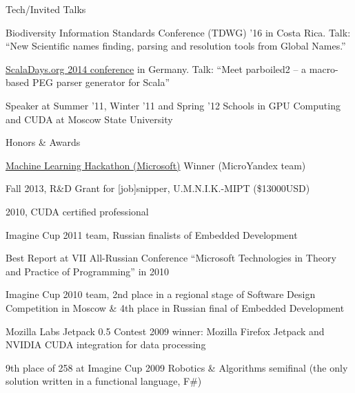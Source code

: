 \documentclass{resume} %
\begin{document}

\begin{rSubsectionSchools}{Tech/Invited Talks}
\item Biodiversity Information Standards Conference (TDWG) '16 in Costa Rica. Talk: ``New 
Scientific names finding, parsing and resolution tools from Global Names.''
\item
\href{https://www.parleys.com/tutorial/meet-parboiled2-a-macro-based-peg-parser-generator-scala-2-10-3}
{ScalaDays.org 2014 conference} in Germany. Talk: ``Meet parboiled2  -- a macro-based PEG
parser generator for Scala''
\item Speaker at Summer '11, Winter '11 and Spring '12 Schools in GPU Computing and CUDA at
Moscow State University
\end{rSubsectionSchools}


\begin{rSubsectionSchools}{Honors \& Awards}
\item \href{https://events.techdays.ru/machine-learning/2015-11/}{Machine Learning Hackathon (Microsoft)} Winner (MicroYandex team)
\item Fall 2013, R\&D Grant for [job]snipper, U.M.N.I.K.-MIPT (\$13000USD)
\item 2010, CUDA certified professional
\item Imagine Cup 2011 team, Russian finalists of Embedded Development
\item Best Report at VII All-Russian Conference ``Microsoft Technologies in Theory and Practice of Programming'' in 2010
\item Imagine Cup 2010 team, 2nd place in a regional stage of Software Design Competition in Moscow \& 4th place in Russian final of Embedded Development
\item Mozilla Labs Jetpack 0.5 Contest 2009 winner: Mozilla Firefox Jetpack and NVIDIA CUDA integration for data processing
\item 9th place of 258 at Imagine Cup 2009 Robotics \& Algorithms semifinal (the only solution written in a functional language, F\#)
\end{rSubsectionSchools}
\end{document}
